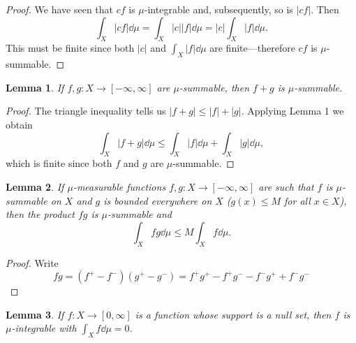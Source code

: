 \documentclass[12pt]{article}
\newtheorem{lemma}{Lemma}
\begin{document}
\begin{proof}
    We have seen that $cf$ is $\mu$-integrable and, subsequently, so is $|cf|$.
    Then
    \[
        \int_X |cf| \dd\mu
            = \int_X |c||f| \dd\mu
            = |c|\int_X |f| \dd\mu.
    \]
    This must be finite since both $|c|$ and $\int_X |f| \dd\mu$ are finite---therefore $cf$ is $\mu$-summable.
\end{proof}

\begin{lemma}
    If $f, g : X \to [-\infty, \infty]$ are $\mu$-summable, then $f + g$ is $\mu$-summable.
\end{lemma}

\begin{proof}
    The triangle inequality tells us $|f + g| \leq |f| + |g|$.
    Applying Lemma 1 we obtain
    \[
        \int_X |f + g| \dd\mu \leq \int_X |f| \dd\mu + \int_X |g| \dd\mu,
    \]
    which is finite since both $f$ and $g$ are $\mu$-summable.
\end{proof}



\begin{lemma}
    If $\mu$-measurable functions $f, g : X \to [-\infty, \infty]$ are such that $f$ is $\mu$-summable on $X$ and $g$ is bounded everywhere on $X$ ($g(x) \leq M$ for all $x \in X$), then the product $fg$ is $\mu$-summable and
    \[
        \int_X fg \dd\mu \leq M \int_X f \dd\mu.
    \]
\end{lemma}

\begin{proof}
    Write
    \[
        fg = (f^+ - f^-)(g^+ - g^-) = f^+ g^+ - f^+ g^- - f^- g^+ + f^- g^-
    \]
\end{proof}


\begin{lemma}
    If $f : X \to [0, \infty]$ is a function whose support is a null set, then $f$ is $\mu$-integrable with $\int_X f \dd\mu = 0$.
\end{lemma}
\end{document}
